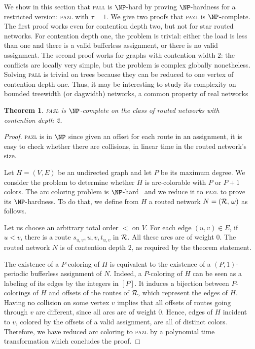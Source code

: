 \documentclass[a4paper,10pt]{journal}
\newtheorem{theorem}{Theorem}
\newcommand\pazl{\textsc{pazl}\xspace}
\newcommand\pall{\textsc{pall}\xspace}
\begin{document}
	We show in this section that \pall is $\NP$-hard by proving $\NP$-hardness for a restricted version: \pazl with $\tau = 1$. We give two proofs that \pazl is $\NP$-complete.
	The first proof works even for contention depth two, but not for star routed networks.
	 For contention depth one, the problem is trivial: either the load is less than one and there is a valid bufferless assignment, or there is no valid assignment. 
	 The second proof works for graphs with contention width $2$: the conflicts are locally very simple, but the problem is complex globally nonetheless. Solving \pall is trivial on trees because they can be reduced to one vertex of contention depth one. Thus, it may be interesting to study its complexity on bounded treewidth (or dagwidth) networks, a common property of real networks~\cite{de2011treewidth}
 

 \begin{theorem}
\pazl is $\NP$-complete on the class of routed networks with contention depth 2.
\end{theorem}
 \begin{proof}
 \pazl is in $\NP$ since given an offset for each route in an assignment, it is easy to check whether there are collisions, in linear time in the routed network's size.
 
  Let $H=(V,E)$ be an undirected graph and let $P$ be its maximum degree. We consider the problem to determine whether $H$ is arc-colorable with $P$ or $P+1$ colors. The arc coloring problem is $\NP$-hard~\cite{holyer1981np} and we reduce it to \pazl to prove its $\NP$-hardness. To do that, we define from $H$ a routed network $N = ({\cal R},\, \omega)$ as follows. 

  Let us choose an arbitrary total order $<$ on $V$.
  For each edge $(u,v) \in E$, if $u<v$, there is a route $s_{u,v},u,v,t_{u,v}$ in ${\cal R}$. 
  All these arcs are of weight $0$. The routed network $N$ is of contention depth $2$, as required by the theorem statement. 

  The existence of a $P$-coloring of $H$ is equivalent to the existence of a $(P,1)$-periodic bufferless assignment of $N$. Indeed, a $P$-coloring of $H$ can be seen as a labeling of its edges by the integers in $[P]$. It induces a bijection between $P$-colorings of $H$ and offsets of the routes of ${\cal R}$, which represent the edges of $H$. Having no collision on some vertex $v$ implies that all offsets of routes going through $v$ are different, since all arcs are of weight $0$. Hence, edges of $H$ incident to $v$, colored by the offsets of a valid assignment, are all of distinct colors. Therefore, we have reduced arc coloring to \pazl by a polynomial time transformation which concludes the proof. 
 \end{proof}
 
\end{document}
